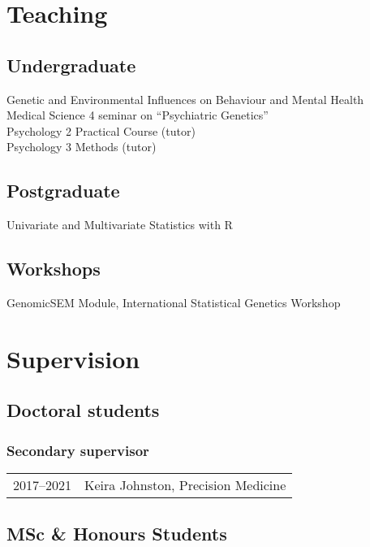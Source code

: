 \documentclass[11pt]{article}
\begin{document}
\section*{Teaching}

\subsection*{Undergraduate}

Genetic and Environmental Influences on Behaviour and Mental Health \\
Medical Science 4 seminar on ``Psychiatric Genetics'' \\ 
Psychology 2 Practical Course (tutor) \\
Psychology 3 Methods (tutor)

\subsection*{Postgraduate}

Univariate and Multivariate Statistics with R 

\subsection*{Workshops}

GenomicSEM Module, International Statistical Genetics Workshop

\section*{Supervision}

\subsection*{Doctoral students}

\subsubsection*{Secondary supervisor}

\begin{tabular}{p{3cm}p{12cm}}

2017--2021 & Keira Johnston, Precision Medicine

\end{tabular}

\subsection*{MSc \& Honours Students}
\end{document}
